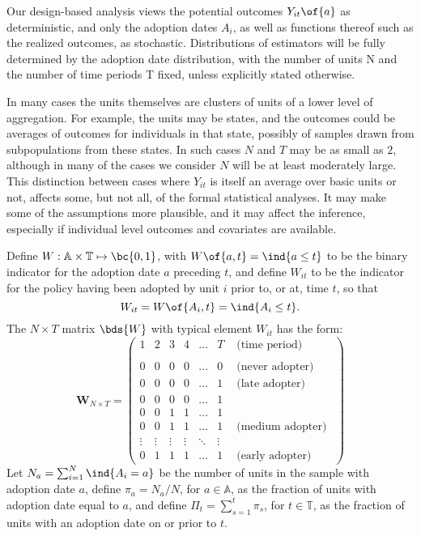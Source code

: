 \documentclass[12pt]{article}
\theoremstyle{definition}
\begin{document}
Our design-based analysis views the potential outcomes $Y_{it}\of{a}$ as deterministic, and only the adoption dates $A_i$, as well as functions thereof such as the realized outcomes, as stochastic. Distributions of estimators will be fully determined by the adoption date distribution, with the number of units N and the number of time periods T fixed, unless explicitly stated otherwise.

In many cases the units themselves are clusters of units of a lower level of aggregation. For example, the units may be states, and the outcomes could be averages of outcomes for individuals in that state, possibly of samples drawn from subpopulations from these states. In such cases $N$ and $T$ may be as small as $2$, although in many of the cases we consider $N$ will be at least moderately large. This distinction between cases where $Y_{it}$ is itself an average over basic units or not, affects some, but not all, of the formal statistical analyses. It may make some of the assumptions more plausible, and it may affect the inference, especially if individual level outcomes and covariates are available.

Define $W: \mathbb{A}\times\mathbb{T} \mapsto \bc{0,1}$, with $W\of{a,t} = \ind{a \leq t}$ to be the binary indicator for the adoption date $a$ preceding $t$, and define $W_{it}$ to be the indicator for the policy having been adopted by unit $i$ prior to, or at, time $t$, so that 
$$
W_{it} = W\of{A_i, t} = \ind{A_i \leq t}.
$$
The $N \times T$ matrix $\bds{W}$ with typical element $W_{it}$ has the form:
$$
\boldsymbol{W}_{N \times T}=\left(\begin{array}{ccccccr}
1 & 2 & 3 & 4 & \ldots & T & \text { (time period) } \\
& & & & & & \\
0 & 0 & 0 & 0 & \ldots & 0 & \text { (never adopter) } \\
0 & 0 & 0 & 0 & \ldots & 1 & \text { (late adopter) } \\
0 & 0 & 0 & 0 & \ldots & 1 & \\
0 & 0 & 1 & 1 & \ldots & 1 & \\
0 & 0 & 1 & 1 & \ldots & 1 & \text { (medium adopter) } \\
\vdots & \vdots & \vdots & \vdots & \ddots & \vdots & \\
0 & 1 & 1 & 1 & \ldots & 1 & \text { (early adopter) }
\end{array}\right)
$$
Let $N_a = \sum_{i=1}^{N} \ind{A_i = a}$ be the number of units in the sample with adoption date $a$, define $\pi_a = N_a / N$, for $a \in \mathbb{A}$, as the fraction of units with adoption date equal to $a$, and define $\Pi_t = \sum_{s=1}^{t}\pi_s$, for $t \in \mathbb{T}$, as the fraction of units with an adoption date on or prior to $t$. 
\end{document}
